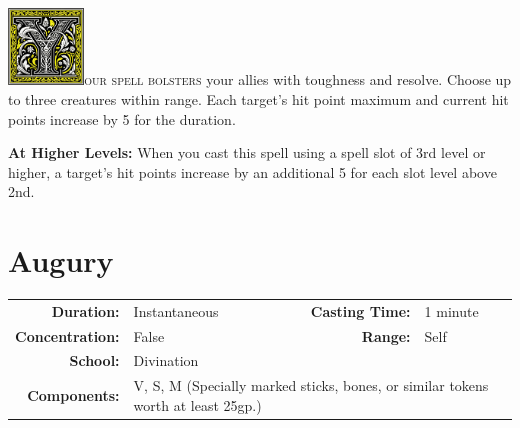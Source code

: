 \documentclass[12pt,showtrims]{memoir}
\begin{document}
\vspace{1\baselineskip}\noindent 
\lettrine[lines=4]{\includegraphics[height=58pt]{initials/Y.png}}{our spell bolsters} your allies with toughness and resolve. Choose up to three creatures within range. Each target's hit point maximum and current hit points increase by 5 for the duration.

\vspace{8pt} \noindent\textbf{At Higher Levels:} When you cast this spell using a spell slot of 3rd level or higher, a target's hit points increase by an additional 5 for each slot level above 2nd.
\newpage
\section*{Augury}

{
\small\centering\vspace{-6pt}
\begin{tabular}{rlrl}
\toprule

\textbf{Duration:} & Instantaneous &
\textbf{Casting Time:} & 1 minute \\
\textbf{Concentration:} & False &
\textbf{Range:} & Self \\
\textbf{School:} & Divination \\
\textbf{Components:} & \multicolumn{3}{p{0.7\textwidth}}{V, S, M (Specially marked sticks, bones, or similar tokens worth at least 25gp.)}\\

\bottomrule
\end{tabular}
}
\end{document}
